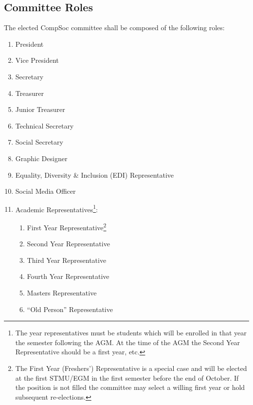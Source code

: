\subsection{Committee Roles}
The elected CompSoc committee shall be composed of the following roles:
\begin{enumerate}
    \item President  
    \item Vice President
    \item Secretary
    \item Treasurer
    \item Junior Treasurer
    \item Technical Secretary
    \item Social Secretary
    \item Graphic Designer
    \item Equality, Diversity \& Inclusion (EDI) Representative
    \item Social Media Officer
    \item Academic Representatives\footnote{ The year representatives must be students which will be enrolled in that year the semester following the AGM\@. At the time of the AGM the Second Year Representative should be a first year, etc.}:
    \begin{enumerate}
        \item First Year Representative\footnote{ The First Year (Freshers') Representative is a special case and will be elected at the first STMU/EGM in the first semester before the end of October. If the position is not filled the committee may select a willing first year or hold subsequent re-elections.}
        \item Second Year Representative
        \item Third Year Representative 
        \item Fourth Year Representative
        \item Masters Representative
        \item ``Old Person'' Representative
    \end{enumerate}
\end{enumerate}

\newpage


